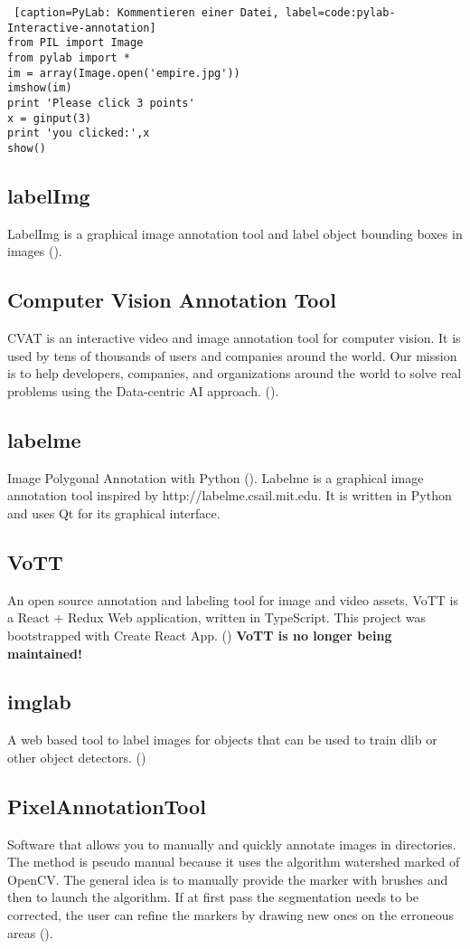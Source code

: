 \begin{lstlisting} [caption=PyLab: Kommentieren einer Datei, label=code:pylab-Interactive-annotation]
from PIL import Image
from pylab import *
im = array(Image.open('empire.jpg'))
imshow(im)
print 'Please click 3 points'
x = ginput(3)
print 'you clicked:',x
show()
\end{lstlisting}

\subsection*{labelImg}
LabelImg is a graphical image annotation tool and label object bounding boxes in images (\cite[][]{labelImg-link}).

\subsection*{Computer Vision Annotation Tool }
CVAT is an interactive video and image annotation tool for computer vision. It is used by tens of thousands of users and companies around the world. Our mission is to help developers, companies, and organizations around the world to solve real problems using the Data-centric AI approach. (\cite[][]{CVAT-link}).

\subsection*{labelme}
Image Polygonal Annotation with Python (\cite[][]{labelme-link}).
Labelme is a graphical image annotation tool inspired by http://labelme.csail.mit.edu.
It is written in Python and uses Qt for its graphical interface.

\subsection*{VoTT}
An open source annotation and labeling tool for image and video assets.
VoTT is a React + Redux Web application, written in TypeScript. This project was bootstrapped with Create React App. (\cite[][]{VoTT-link})
\textbf{VoTT is no longer being maintained!}

\subsection*{imglab}
A web based tool to label images for objects that can be used to train dlib or other object detectors. (\cite[][]{imglab-link})

\subsection*{PixelAnnotationTool}
Software that allows you to manually and quickly annotate images in directories. The method is pseudo manual because it uses the algorithm watershed marked of OpenCV. The general idea is to manually provide the marker with brushes and then to launch the algorithm. If at first pass the segmentation needs to be corrected, the user can refine the markers by drawing new ones on the erroneous areas (\cite[][]{PixelAnnotationTool-link}).